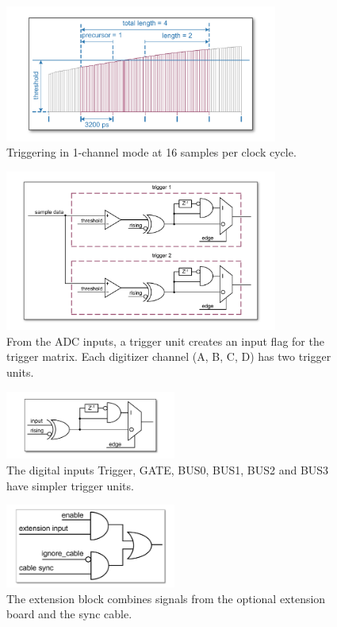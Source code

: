 \begin{figure}[ht]
    \centering
    \includegraphics[width=0.8\textwidth]{figures/1ChannelTriggering.pdf}
    \caption{Triggering in 1-channel mode at 16 samples per clock cycle.\label{fig:1ChannelTriggering}}
\end{figure}

\begin{figure}[hb]
    \centering
    \includegraphics[width=0.8\textwidth]{figures/analog-trigger.pdf}
    \caption{From the ADC inputs, a trigger unit creates an input flag for the trigger matrix. Each digitizer channel (A, B, C, D) has two trigger units.\label{fig:analog-trigger}}
\end{figure}

\begin{figure}[ht]
    \centering
    \includegraphics[width=0.5\textwidth]{figures/DigitalInput.pdf}
    \caption{The digital inputs Trigger, GATE, BUS0, BUS1, BUS2 and BUS3 have simpler trigger units.\label{fig:DigitalInput}}
\end{figure}

\begin{figure}
    \centering
    \includegraphics[width=0.5\textwidth]{figures/ExtensionBlock.pdf}
    \caption{\label{fig:ExtensionBlock} The extension block combines signals from the optional extension board and the sync cable.}
\end{figure}

